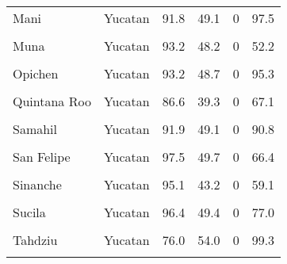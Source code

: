 \documentclass[
]{report}
\begin{document}
\begin{longtable}[t]{llrrrr}
Mani & Yucatan & 91.8 & 49.1 & 0 & 97.5\\
\cellcolor{gray!6}{Mayapan} & \cellcolor{gray!6}{Yucatan} & \cellcolor{gray!6}{75.5} & \cellcolor{gray!6}{45.0} & \cellcolor{gray!6}{0} & \cellcolor{gray!6}{87.0}\\
Muna & Yucatan & 93.2 & 48.2 & 0 & 52.2\\
\addlinespace
\cellcolor{gray!6}{Muxupip} & \cellcolor{gray!6}{Yucatan} & \cellcolor{gray!6}{94.2} & \cellcolor{gray!6}{47.4} & \cellcolor{gray!6}{0} & \cellcolor{gray!6}{83.2}\\
Opichen & Yucatan & 93.2 & 48.7 & 0 & 95.3\\
\cellcolor{gray!6}{Panaba} & \cellcolor{gray!6}{Yucatan} & \cellcolor{gray!6}{92.4} & \cellcolor{gray!6}{45.8} & \cellcolor{gray!6}{0} & \cellcolor{gray!6}{78.7}\\
Quintana Roo & Yucatan & 86.6 & 39.3 & 0 & 67.1\\
\cellcolor{gray!6}{Rio Lagartos} & \cellcolor{gray!6}{Yucatan} & \cellcolor{gray!6}{96.4} & \cellcolor{gray!6}{44.0} & \cellcolor{gray!6}{0} & \cellcolor{gray!6}{72.3}\\
\addlinespace
Samahil & Yucatan & 91.9 & 49.1 & 0 & 90.8\\
\cellcolor{gray!6}{Sanahcat} & \cellcolor{gray!6}{Yucatan} & \cellcolor{gray!6}{93.8} & \cellcolor{gray!6}{43.8} & \cellcolor{gray!6}{0} & \cellcolor{gray!6}{92.2}\\
San Felipe & Yucatan & 97.5 & 49.7 & 0 & 66.4\\
\cellcolor{gray!6}{Santa Elena} & \cellcolor{gray!6}{Yucatan} & \cellcolor{gray!6}{90.0} & \cellcolor{gray!6}{43.7} & \cellcolor{gray!6}{0} & \cellcolor{gray!6}{96.1}\\
Sinanche & Yucatan & 95.1 & 43.2 & 0 & 59.1\\
\addlinespace
\cellcolor{gray!6}{Sotuta} & \cellcolor{gray!6}{Yucatan} & \cellcolor{gray!6}{92.5} & \cellcolor{gray!6}{46.4} & \cellcolor{gray!6}{0} & \cellcolor{gray!6}{90.6}\\
Sucila & Yucatan & 96.4 & 49.4 & 0 & 77.0\\
\cellcolor{gray!6}{Sudzal} & \cellcolor{gray!6}{Yucatan} & \cellcolor{gray!6}{91.5} & \cellcolor{gray!6}{43.1} & \cellcolor{gray!6}{0} & \cellcolor{gray!6}{78.4}\\
Tahdziu & Yucatan & 76.0 & 54.0 & 0 & 99.3\\
\cellcolor{gray!6}{Tahmek} & \cellcolor{gray!6}{Yucatan} & \cellcolor{gray!6}{95.0} & \cellcolor{gray!6}{48.5} & \cellcolor{gray!6}{0} & \cellcolor{gray!6}{67.1}\\

\end{longtable}
\end{document}
